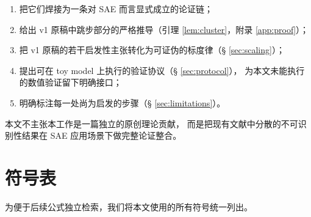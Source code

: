 \documentclass[11pt,a4paper]{article}
\theoremstyle{remark}
\begin{document}
\begin{enumerate}[leftmargin=*,itemsep=2pt]
\item 把它们焊接为一条对 SAE 而言显式成立的论证链；
\item 给出 v1 原稿中跳步部分的严格推导（引理 \ref{lem:cluster}，附录 \ref{app:proof}）；
\item 把 v1 原稿的若干启发性主张转化为可证伪的标度律（§ \ref{sec:scaling}）；
\item 提出可在 toy model 上执行的验证协议（§ \ref{sec:protocol}），
为本文未能执行的数值验证留下明确接口；
\item 明确标注每一处尚为启发的步骤（§ \ref{sec:limitations}）。
\end{enumerate}

本文不主张本工作是一篇独立的原创理论贡献，
而是把现有文献中分散的不可识别性结果在 SAE 应用场景下做完整论证整合。

\section{符号表}\label{sec:notation}

为便于后续公式独立检索，我们将本文使用的所有符号统一列出。
\end{document}
